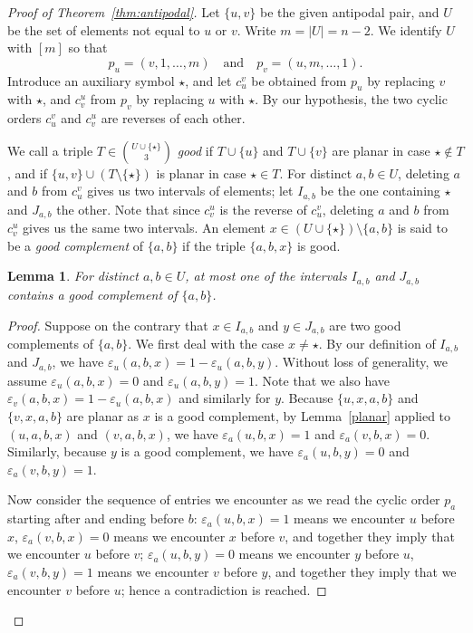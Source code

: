 \documentclass[10pt,a4paper]{amsart}
\newtheorem{lemma}{Lemma}
\begin{document}
\begin{proof}[Proof of Theorem~\ref{thm:antipodal}]
Let \(\{u,v\}\) be the given antipodal pair, and
\(U\) be the set of elements not equal to \(u\) or \(v\). Write \(m=|U|=n-2\). We identify \(U\)
with \([m]\) so that
\[
p_u=(v,1,\ldots,m)
\quad\text{and}\quad
p_v=(u,m,\ldots,1).
\]
Introduce an auxiliary symbol \(\star\), and let \(c_u^v\) be obtained
from \(p_u\) by replacing \(v\) with \(\star\), and \(c_v^u\) from
\(p_v\) by replacing \(u\) with \(\star\). By our hypothesis, the two cyclic orders \(c_u^v\) and \(c_v^u\) are reverses of each other.

We call a triple \(T\in\binom{U\cup\{\star\}}3\) \emph{good} if
\(T\cup\{u\}\) and \(T\cup\{v\}\) are planar in case
\(\star\notin T\), and if \(\{u,v\}\cup(T\setminus\{\star\})\) is
planar in case \(\star\in T\). For distinct \(a,b\in U\), deleting \(a\) and \(b\) from \(c_u^v\) gives us two intervals of elements; let \(I_{a,b}\) be the one containing \(\star\) and
\(J_{a,b}\) the other. Note that since \(c_v^u\) is the reverse of \(c_u^v\), deleting \(a\) and \(b\) from \(c_v^u\) gives us the same two intervals. An element \(x \in (U\cup\{\star\}) \setminus \{a,b\}\) is said to be a \emph{good complement} of \(\{a,b\}\) if the triple \(\{a,b,x\}\) is good.

\begin{lemma}\label{lem:good-interval}
For distinct \(a,b\in U\), at most one of the intervals \(I_{a,b}\) and \(J_{a,b}\) contains a good complement of \(\{a,b\}\).
\end{lemma}

\begin{proof}

Suppose on the contrary that \(x \in I_{a,b}\) and \(y \in J_{a,b}\) are two good complements of \(\{a,b\}\). We first deal with the case \(x \neq \star\). By our definition of \(I_{a,b}\) and \(J_{a,b}\), we have \(\varepsilon_u(a,b,x) = 1 - \varepsilon_u(a,b,y)\). Without loss of generality, we assume \(\varepsilon_u(a,b,x) = 0\) and \(\varepsilon_u(a,b,y) = 1\). Note that we also have \(\varepsilon_v(a,b,x) = 1 -\varepsilon_u(a,b,x)\) and similarly for \(y\). Because \(\{u,x,a,b\}\) and \(\{v,x,a,b\}\) are planar as \(x\) is a good complement, by Lemma~\ref{planar} applied to \((u,a,b,x)\) and \((v,a,b,x)\), we have \(\varepsilon_a(u,b,x)=1\) and \(\varepsilon_a(v,b,x)=0\). Similarly, because \(y\) is a good complement, we have \(\varepsilon_a(u,b,y)=0\) and \(\varepsilon_a(v,b,y)=1\).

Now consider the sequence of entries we encounter as we read the cyclic order \(p_a\) starting after and ending before \(b\): \(\varepsilon_a(u,b,x)=1\) means we encounter \(u\) before \(x\), \(\varepsilon_a(v,b,x)=0\) means we encounter \(x\) before \(v\), and together they imply that we encounter \(u\) before \(v\);  \(\varepsilon_a(u,b,y)=0\) means we encounter \(y\) before \(u\), \(\varepsilon_a(v,b,y)=1\) means we encounter \(v\) before \(y\), and together they imply that we encounter \(v\) before \(u\); hence a contradiction is reached.


\end{proof}
\end{proof}
\end{document}
